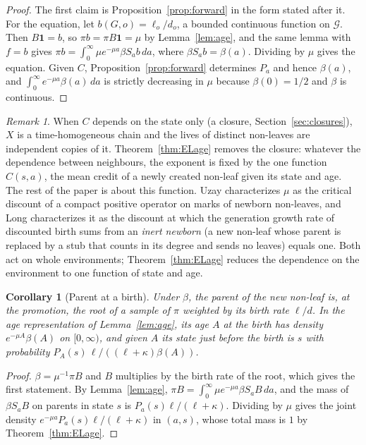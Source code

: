 \documentclass[11pt]{article}
\theoremstyle{plain}
\newtheorem{corollary}[theorem]{Corollary}
\theoremstyle{definition}
\theoremstyle{remark}
\newtheorem{remark}[theorem]{Remark}
\begin{document}
\begin{proof}
The first claim is Proposition~\ref{prop:forward} in the form stated after it. For the equation, let $b(G,o)=\ell_o/d_o$, a bounded continuous function on $\mathcal G$. Then $B\mathbf 1=b$, so $\pi b=\pi B\mathbf1=\mu$ by Lemma~\ref{lem:age}, and the same lemma with $f=b$ gives $\pi b=\int_0^\infty\mu e^{-\mu a}\beta S_ab\,da$, where $\beta S_ab=\beta(a)$. Dividing by $\mu$ gives the equation. Given $C$, Proposition~\ref{prop:forward} determines $P_a$ and hence $\beta(a)$, and $\int_0^\infty e^{-\mu a}\beta(a)\,da$ is strictly decreasing in $\mu$ because $\beta(0)=1/2$ and $\beta$ is continuous.
\end{proof}

\begin{remark}
When $C$ depends on the state only (a closure, Section~\ref{sec:closures}), $X$ is a time-homogeneous chain and the lives of distinct non-leaves are independent copies of it. Theorem~\ref{thm:ELage} removes the closure: whatever the dependence between neighbours, the exponent is fixed by the one function $C(s,a)$, the mean credit of a newly created non-leaf given its state and age. The rest of the paper is about this function. Uzay \cite[Theorem~``Compact reproduction kernel'']{UzayR3} characterizes $\mu$ as the critical discount of a compact positive operator on marks of newborn non-leaves, and Long \cite{LongKernel} characterizes it as the discount at which the generation growth rate of discounted birth sums from an \emph{inert newborn} (a new non-leaf whose parent is replaced by a stub that counts in its degree and sends no leaves) equals one. Both act on whole environments; Theorem~\ref{thm:ELage} reduces the dependence on the environment to one function of state and age.
\end{remark}

\begin{corollary}[Parent at a birth]\label{cor:parent}
Under $\beta$, the parent of the new non-leaf is, at the promotion, the root of a sample of $\pi$ weighted by its birth rate $\ell/d$. In the age representation of Lemma~\ref{lem:age}, its age $A$ at the birth has density $e^{-\mu A}\beta(A)$ on $[0,\infty)$, and given $A$ its state just before the birth is $s$ with probability $P_A(s)\,\ell/((\ell+\kappa)\beta(A))$.
\end{corollary}

\begin{proof}
$\beta=\mu^{-1}\pi B$ and $B$ multiplies by the birth rate of the root, which gives the first statement. By Lemma~\ref{lem:age}, $\pi B=\int_0^\infty\mu e^{-\mu a}\beta S_aB\,da$, and the mass of $\beta S_aB$ on parents in state $s$ is $P_a(s)\ell/(\ell+\kappa)$. Dividing by $\mu$ gives the joint density $e^{-\mu a}P_a(s)\ell/(\ell+\kappa)$ in $(a,s)$, whose total mass is $1$ by Theorem~\ref{thm:ELage}.
\end{proof}
\end{document}
